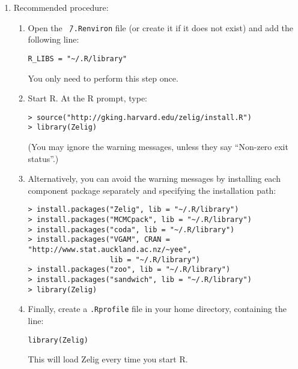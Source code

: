 \begin{enumerate}
\item Recommended procedure: 
  \begin{enumerate}
  \item Open the {\tt \~\,/.Renviron} file (or create it if it does
    not exist) and add the following line:
\begin{verbatim}
R_LIBS = "~/.R/library"
\end{verbatim}
    You only need to perform this step once.
  \item Start R.  At the R prompt, type:
\begin{verbatim}
> source("http://gking.harvard.edu/zelig/install.R")
> library(Zelig)
\end{verbatim}
(You may ignore the warning messages, unless they say ``Non-zero exit 
status''.)
\item Alternatively, you can avoid the warning messages by installing each 
component package separately and specifying the installation path:  
\begin{verbatim}
> install.packages("Zelig", lib = "~/.R/library")
> install.packages("MCMCpack", lib = "~/.R/library")
> install.packages("coda", lib = "~/.R/library")
> install.packages("VGAM", CRAN = "http://www.stat.auckland.ac.nz/~yee",
                   lib = "~/.R/library")
> install.packages("zoo", lib = "~/.R/library")
> install.packages("sandwich", lib = "~/.R/library")
> library(Zelig)
\end{verbatim}
\item Finally, create a {\tt .Rprofile} file in your home directory, containing the line:
\begin{verbatim}
library(Zelig)
\end{verbatim}
This will load Zelig every time you start R.  
  \end{enumerate}  


\end{enumerate}
